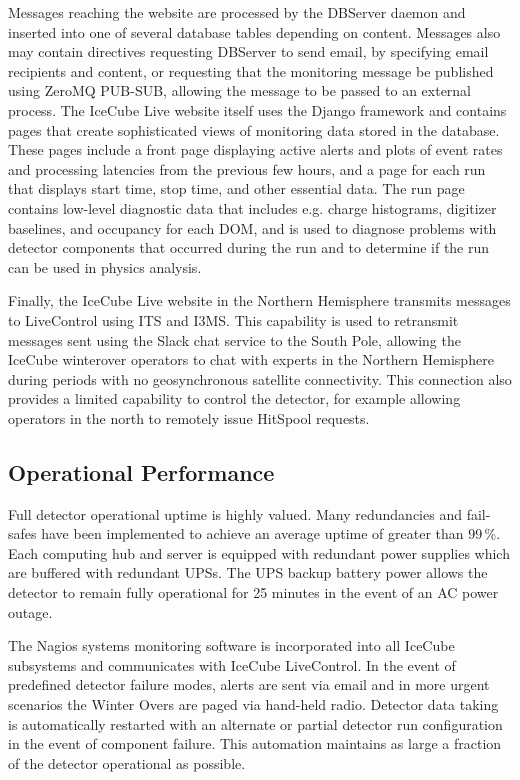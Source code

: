 Messages reaching the website are processed by the DBServer daemon and inserted into one of several database tables depending on content.
Messages also may contain directives requesting DBServer to send email, by specifying email recipients and content,
or requesting that the monitoring message be published using ZeroMQ
PUB-SUB, allowing the message to be passed to an external process.
The IceCube Live
website itself uses the Django framework and contains pages that create sophisticated views of monitoring data stored in the database.
These pages include a front page displaying active alerts and plots of event rates and processing latencies from the previous few hours, and
a page for each run that displays start time, stop time, and other essential data.  The run page contains low-level diagnostic data that
includes e.g. charge histograms, digitizer baselines, and occupancy for each DOM, and is used to diagnose problems with detector components
that occurred during the run and to determine if the run can be used in physics analysis.

Finally, the IceCube Live website in the Northern Hemisphere transmits messages to LiveControl using ITS and I3MS.  This capability is used to retransmit
messages sent using the Slack chat service to the South Pole, allowing the IceCube winterover operators to chat with
experts in the Northern Hemisphere during periods with no geosynchronous satellite connectivity.  This connection also provides a limited
capability to control the detector, for example allowing operators in the north to remotely issue HitSpool requests.



\subsection{Operational Performance}

Full detector operational uptime is highly valued. Many redundancies and fail-safes have been implemented to achieve an average uptime of greater than 99\,\%. Each computing hub and server is equipped with redundant power supplies which are buffered with redundant UPSs. The UPS backup battery power allows the detector to remain fully operational for 25 minutes in the event of an AC power outage. 

The Nagios systems monitoring software is incorporated into all IceCube subsystems and communicates with IceCube LiveControl. In the event of predefined detector failure modes, alerts are sent via email and in more urgent scenarios the Winter Overs are paged via hand-held radio. Detector data taking is automatically restarted with an alternate or partial detector run configuration in the event of component failure.  This automation maintains as large a fraction of the detector operational as possible. 

